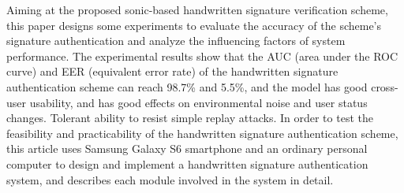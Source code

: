 \begin{englishabstract}
Aiming at the proposed sonic-based handwritten signature verification scheme, this paper designs some experiments to evaluate the accuracy of the scheme's signature authentication and analyze the influencing factors of system performance. The experimental results show that the AUC (area under the ROC curve) and EER (equivalent error rate) of the handwritten signature authentication scheme can reach 98.7\% and 5.5\%, and the model has good cross-user usability, and has good effects on environmental noise and user status changes. Tolerant ability to resist simple replay attacks. In order to test the feasibility and practicability of the handwritten signature authentication scheme, this article uses Samsung Galaxy S6 smartphone and an ordinary personal computer to design and implement a handwritten signature authentication system, and describes each module involved in the system in detail.

\end{englishabstract}

